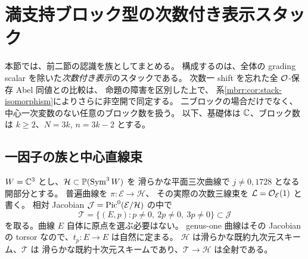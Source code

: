 \section{満支持ブロック型の次数付き表示スタック}
\label{mbs:sec:presentations}

本節では、前二節の認識を族としてまとめる。
構成するのは、全体の grading scalar を除いた\emph{次数付き表示}のスタックである。
次数一 shift を忘れた全 $\mathcal O$-保存 Abel 同値との比較は、
命題の障害を区別した上で、
系\ref{mbrr:cor:stack-isomorphism}によりさらに非空開で同定する。
二ブロックの場合だけでなく、中心一次変数のない任意のブロック数を扱う。
以下、基礎体は $\mathbb C$、ブロック数は $k\geq2$、$N=3k$, $n=3k-2$ とする。

\subsection{一因子の族と中心直線束}

$W=\mathbb C^3$ とし、$\mathcal H\subset\mathbb P(\operatorname{Sym}^3W)$ を
滑らかな平面三次曲線で $j\ne0,1728$ となる開部分とする。
普遍曲線を $\pi:\mathcal E\to\mathcal H$、
その実際の次数三線束を $\mathcal L=\mathcal O_{\mathcal E}(1)$ と書く。
相対 Jacobian $\mathcal J=\operatorname{Pic}^0(\mathcal E/\mathcal H)$ の中で
\begin{equation}\label{mbs:eq:factor-chart}
 \mathcal T=\{(E,p):p\ne0,\ 2p\ne0,\ 3p\ne0\}
       \subset\mathcal J
\end{equation}
を取る。曲線 $E$ 自体に原点を選ぶ必要はない。
genus-one 曲線はその Jacobian の torsor なので、$t_p:E\to E$ は自然に定まる。
$\mathcal H$ は滑らかな既約九次元スキーム、$\mathcal T$ は
滑らかな既約十次元スキームであり、$\mathcal T\to\mathcal H$ は全射である。

